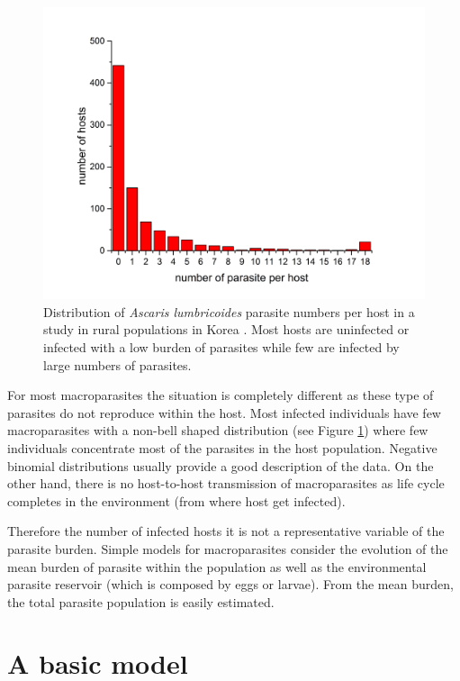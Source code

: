 \documentclass[12pt,a4paper]{article}
\theoremstyle{plain}%
\theoremstyle{definition}
\theoremstyle{remark}
\begin{document}
\begin{figure}[t!]
	\centering
	\includegraphics[width=0.99\linewidth]{dataseo}
	\caption{Distribution of \textit{Ascaris lumbricoides} parasite numbers per host in a study in rural populations in Korea \cite{seo1979frequency}. 
	Most hosts are uninfected or infected with a low burden of parasites while few are infected by large numbers of parasites.}
	\label{fig:dataseo}
\end{figure}

For most macroparasites the situation is completely different as these type of parasites do not reproduce within the host.  Most  infected  individuals have few macroparasites with a non-bell shaped distribution (see Figure \ref{fig:dataseo}) where few individuals concentrate most of the parasites in the host population. Negative binomial distributions usually provide a good description of the data. On the other hand, there is no host-to-host transmission of macroparasites as life cycle completes in the environment (from where host get infected).  


Therefore the number of infected hosts it is not a representative variable of the parasite burden. Simple models for macroparasites consider the evolution of the mean burden of parasite within the population as well as the environmental parasite reservoir (which is composed by eggs or larvae). From the mean burden, the total parasite population is easily estimated. 


	
\section{A basic model}
\label{s:basicmodel}
 
\end{document}

